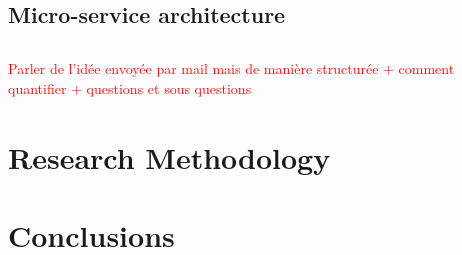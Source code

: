 \documentclass[11pt]{article}
\begin{document}
\subsection{Micro-service architecture}

\subsection{ }
\textcolor{red}{Parler de l'idée envoyée par mail mais de manière structurée + comment quantifier + questions et sous questions}


\section{Research Methodology}


\section{Conclusions}


\newpage
\listoffigures
\nocite{*}
\printbibliography
\end{document}
